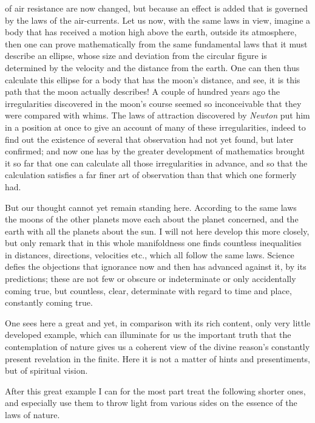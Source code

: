 \documentclass[12pt,a4paper,openany]{book}
\newcommand{\opage}[1]{\marginnote{\footnotesize\textit{[#1]}}}
\begin{document}
of air resistance are now changed, but because an effect is added that is governed
by the laws of the air-currents. Let us now, with the same laws in view, imagine a
body that has received a motion high above the earth, outside its atmosphere, then
one can prove mathematically from the same fundamental laws that it must describe an
ellipse, whose size and deviation from the circular figure is determined by the
velocity and the distance from the earth. One can then
\setcounter{footnote}{0}%
\opage{71}thus calculate this ellipse for a body that has the moon's distance, and see, it is
this path that the moon actually describes! A couple of hundred years ago the
irregularities discovered in the moon's course seemed so inconceivable that they
were compared with whims. The laws of attraction discovered by \textit{Newton} put
him in a position at once to give an account of many of these irregularities, indeed
to find out the existence of several that observation had not yet found, but later
confirmed; and now one has by the greater development of mathematics brought it so
far that one can calculate all those irregularities in advance, and so that the
calculation satisfies a far finer art of observation than that which one formerly
had.

But our thought cannot yet remain standing here. According to the same laws the
moons of the other planets move each about the planet concerned, and the earth with
all the planets about the sun. I will not here develop this more closely, but only
remark that in this whole manifoldness one finds countless inequalities in
distances, directions, velocities etc., which all follow the same laws. Science
defies the objections that ignorance now and then has advanced against it, by its
predictions; these are not few or obscure or indeterminate or only accidentally
coming true, but countless, clear, determinate with regard to time and place,
constantly coming true.


One sees here a great and yet, in comparison with its rich content, only very little
developed example, which can illuminate for us the important truth that the
contemplation of nature gives us a coherent view of the divine reason's constantly
present revelation in the finite. Here it is not a matter of hints and
presentiments, but of spiritual vision.

After this great example I can for the most part treat the following shorter ones,
and especially use them to throw light from various sides on the essence of the laws
of nature.
\end{document}
